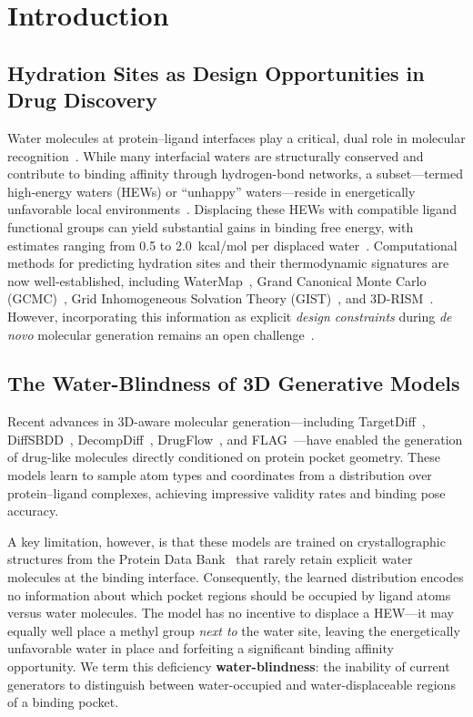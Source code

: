 \documentclass[11pt,letterpaper]{article}
\begin{document}
\section{Introduction}

\subsection{Hydration Sites as Design Opportunities in Drug Discovery}

Water molecules at protein--ligand interfaces play a critical, dual role in
molecular recognition~\cite{ladbury1996,spyrakis2017}.  While many interfacial
waters are structurally conserved and contribute to binding affinity through
hydrogen-bond networks, a subset---termed high-energy waters (HEWs) or
``unhappy'' waters---reside in energetically unfavorable local
environments~\cite{young2007,abel2008}.  Displacing these HEWs with compatible
ligand functional groups can yield substantial gains in binding free energy,
with estimates ranging from 0.5 to 2.0~kcal/mol per displaced
water~\cite{michel2009,wang2015}.  Computational methods for predicting
hydration sites and their thermodynamic signatures are now well-established,
including WaterMap~\cite{abel2008}, Grand Canonical Monte Carlo
(GCMC)~\cite{ross2012}, Grid Inhomogeneous Solvation Theory
(GIST)~\cite{nguyen2012}, and 3D-RISM~\cite{luchko2010}.  However, incorporating
this information as explicit \emph{design constraints} during \emph{de novo}
molecular generation remains an open challenge~\cite{spyrakis2017}.

\subsection{The Water-Blindness of 3D Generative Models}

Recent advances in 3D-aware molecular generation---including
TargetDiff~\cite{guan2023}, DiffSBDD~\cite{schneuing2024}, DecompDiff~\cite{guan2023decomp},
DrugFlow~\cite{drugflow2024}, and FLAG~\cite{zhang2024flag}---have enabled the
generation of drug-like molecules directly conditioned on protein pocket
geometry.  These models learn to sample atom types and coordinates from a
distribution over protein--ligand complexes, achieving impressive validity rates
and binding pose accuracy.

A key limitation, however, is that these models are trained on crystallographic
structures from the Protein Data Bank~\cite{berman2000} that rarely retain
explicit water molecules at the binding interface.  Consequently, the learned
distribution encodes no information about which pocket regions should be
occupied by ligand atoms versus water molecules.  The model has no incentive to
displace a HEW---it may equally well place a methyl group \emph{next to} the
water site, leaving the energetically unfavorable water in place and forfeiting
a significant binding affinity opportunity.  We term this deficiency
\textbf{water-blindness}: the inability of current generators to distinguish
between water-occupied and water-displaceable regions of a binding pocket.
\end{document}
